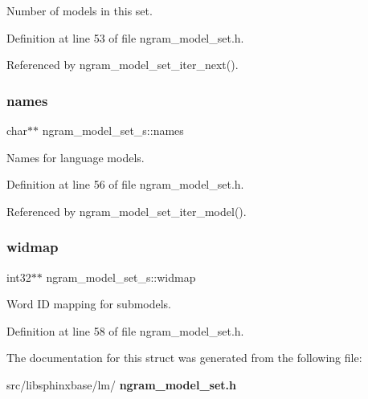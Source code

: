 Number of models in this set. 



Definition at line 53 of file ngram\+\_\+model\+\_\+set.\+h.



Referenced by ngram\+\_\+model\+\_\+set\+\_\+iter\+\_\+next().

\mbox{\label{structngram__model__set__s_aff5e13c45decde4c5bf30d8aa2b1c7d9}} 
\subsubsection{names}
{\footnotesize\ttfamily char$\ast$$\ast$ ngram\+\_\+model\+\_\+set\+\_\+s\+::names}



Names for language models. 



Definition at line 56 of file ngram\+\_\+model\+\_\+set.\+h.



Referenced by ngram\+\_\+model\+\_\+set\+\_\+iter\+\_\+model().

\mbox{\label{structngram__model__set__s_addebde44e2b7aa22dd82032c316fc962}} 
\subsubsection{widmap}
{\footnotesize\ttfamily int32$\ast$$\ast$ ngram\+\_\+model\+\_\+set\+\_\+s\+::widmap}



Word ID mapping for submodels. 



Definition at line 58 of file ngram\+\_\+model\+\_\+set.\+h.



The documentation for this struct was generated from the following file\+:\begin{DoxyCompactItemize}
\item 
src/libsphinxbase/lm/\textbf{ ngram\+\_\+model\+\_\+set.\+h}\end{DoxyCompactItemize}

